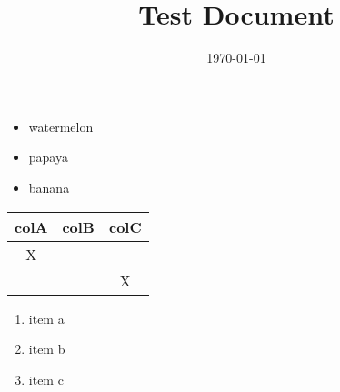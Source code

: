 \documentclass{article}
\title{Test Document}
\date{\today}
\begin{document}
\maketitle
\begin{itemize}
\item watermelon
\item papaya
\item banana
\end{itemize}
\begin{tabular}{|c|c|c|}\hline 
colA & colB & colC \\ \hline
X &  &  \\ \hline
 &  & X \\ \hline
\end{tabular}
\begin{enumerate}
\item item a
\item item b
\item item c
\end{enumerate}
\end{document}
